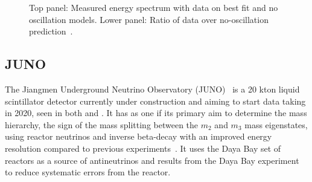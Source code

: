 \begin{figure}[h!]
\begin{minipage}[b]{0.49\textwidth}
       \vspace{2mm}
    \caption{Top panel: Measured energy spectrum with data on best fit and no oscillation models. Lower panel: Ratio of data over no-oscillation prediction~\cite{72Double}.}
     \label{fig:dc2}
  \end{minipage}
\end{figure}

\subsection{JUNO}

The Jiangmen Underground Neutrino Observatory (JUNO)~\cite{75Juno} is a 20 kton liquid scintillator detector currently under construction and aiming to start data taking in 2020, seen in both  and . It has as one if its primary aim to determine the mass hierarchy, the sign of the mass splitting between the $m_2$ and $m_3$ mass eigenstates, using reactor neutrinos and inverse beta-decay with an improved energy resolution compared to previous experiments~\cite{75Juno}. It uses the Daya Bay set of reactors as a source of antineutrinos and results from the Daya Bay experiment to reduce systematic errors from the reactor.


